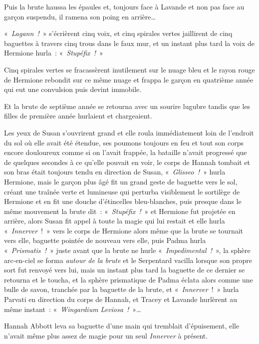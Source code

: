 Puis la brute haussa les épaules et, toujours face à Lavande et non pas face au garçon suspendu, il ramena son poing en arrière…

«~\emph{Lagann~!}~» s'écrièrent cinq voix, et cinq spirales vertes jaillirent de cinq baguettes à travers cinq trous dans le faux mur, et un instant plus tard la voix de Hermione hurla~: «~\emph{Stupéfix~!}~»

Cinq spirales vertes se fracassèrent inutilement sur le nuage bleu et le rayon rouge de Hermione rebondit sur ce même nuage et frappa le garçon en quatrième année qui eut une convulsion puis devint immobile.

Et la brute de septième année se retourna avec un sourire lugubre tandis que les filles de première année hurlaient et chargeaient.

\later

Les yeux de Susan s'ouvrirent grand et elle roula immédiatement loin de l'endroit du sol où elle avait été étendue, ses poumons toujours en feu et tout son corps encore douloureux comme si on l'avait frappée, la bataille n'avait progressé que de quelques secondes à ce qu'elle pouvait en voir, le corps de Hannah tombait et son bras était toujours tendu en direction de Susan, «~\emph{Glisseo~!}~» hurla Hermione, mais le garçon plus âgé fit un grand geste de baguette vers le sol, créant une traînée verte et lumineuse qui perturba visiblement le sortilège de Hermione et en fit une douche d'étincelles bleu-blanches, puis presque dans le même mouvement la brute dit~: «~\emph{Stupéfix~!}~» et Hermione fut projetée en arrière, alors Susan fit appel à toute la magie qui lui restait et elle hurla «~\emph{Innerver}~!~» vers le corps de Hermione alors même que la brute se tournait vers elle, baguette pointée de nouveau vers elle, puis Padma hurla «~\emph{Prismatis~!}~» juste avant que la brute ne hurle «~\emph{Impedimental~!}~», la sphère arc-en-ciel se forma \emph{autour de la brute} et le Serpentard vacilla lorsque son propre sort fut renvoyé vers lui, mais un instant plus tard la baguette de ce dernier se retourna et le toucha, et la sphère prismatique de Padma éclata alors comme une bulle de savon, tranchée par la baguette de la brute, et «~\emph{Innerver}~!~» hurla Parvati en direction du corps de Hannah, et Tracey et Lavande hurlèrent au même instant~: «~\emph{Wingardium Leviosa~!}~»…

\later

Hannah Abbott leva sa baguette d'une main qui tremblait d'épuisement, elle n'avait même plus assez de magie pour un seul \emph{Innerver} à présent.

